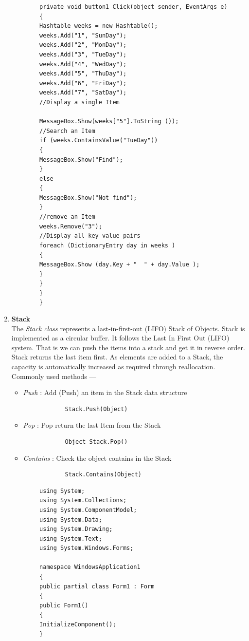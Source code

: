 \documentclass[11pt,dvipsnames,cmyk]{article}
\begin{document}
\begin{enumerate}
\begin{verbatim}
		private void button1_Click(object sender, EventArgs e)
		{
		Hashtable weeks = new Hashtable();
		weeks.Add("1", "SunDay");
		weeks.Add("2", "MonDay");
		weeks.Add("3", "TueDay");
		weeks.Add("4", "WedDay");
		weeks.Add("5", "ThuDay");
		weeks.Add("6", "FriDay");
		weeks.Add("7", "SatDay");
		//Display a single Item 
		
		MessageBox.Show(weeks["5"].ToString ());
		//Search an Item 
		if (weeks.ContainsValue("TueDay"))
		{
		MessageBox.Show("Find");
		}
		else
		{
		MessageBox.Show("Not find");
		}
		//remove an Item 
		weeks.Remove("3");
		//Display all key value pairs
		foreach (DictionaryEntry day in weeks )
		{
		MessageBox.Show (day.Key + "  " + day.Value );
		}
		}
		}
		}
		\end{verbatim}
		
		\item \textbf{Stack}
		\\The \emph{Stack class} represents a last-in-first-out (LIFO) Stack of Objects. Stack is implemented as a circular buffer. It follows the Last In First Out (LIFO) system. That is we can push the items into a stack and get it in reverse order. Stack returns the last item first. As elements are added to a Stack, the capacity is automatically increased as required through reallocation.
		\\Commonly used methods ---
		\begin{itemize}
			\item \emph{Push} : Add (Push) an item in the Stack data structure
			\begin{verbatim}
			Stack.Push(Object)
			\end{verbatim}
			\item \emph{Pop} : Pop return the last Item from the Stack
			\begin{verbatim} 
			Object Stack.Pop()			
			\end{verbatim}
			\item \emph{Contains} : Check the object contains in the Stack
			\begin{verbatim} 
			Stack.Contains(Object)			
			\end{verbatim}
		\end{itemize}
		\begin{verbatim}
		using System;
		using System.Collections;
		using System.ComponentModel;
		using System.Data;
		using System.Drawing;
		using System.Text;
		using System.Windows.Forms;
		
		namespace WindowsApplication1
		{
		public partial class Form1 : Form
		{
		public Form1()
		{
		InitializeComponent();
		}
		

\end{verbatim}
\end{enumerate}
\end{document}
